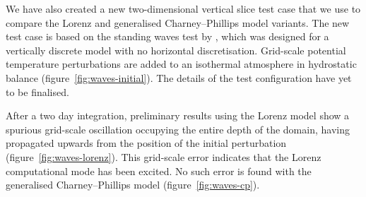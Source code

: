 \documentclass[a4paper,11pt]{article}
\begin{document}
We have also created a new two-dimensional vertical slice test case that we use to compare the Lorenz and generalised Charney--Phillips model variants.
The new test case is based on the standing waves test by \citet{arakawa-konor1996}, which was designed for a vertically discrete model with no horizontal discretisation.
Grid-scale potential temperature perturbations are added to an isothermal atmosphere in hydrostatic balance (figure~\ref{fig:waves-initial}).  The details of the test configuration have yet to be finalised.

After a two day integration, preliminary results using the Lorenz model show a spurious grid-scale oscillation occupying the entire depth of the domain, having propagated upwards from the position of the initial perturbation (figure~\ref{fig:waves-lorenz}).  This grid-scale error indicates that the Lorenz computational mode has been excited.  No such error is found with the generalised Charney--Phillips model (figure~\ref{fig:waves-cp}).
\end{document}
